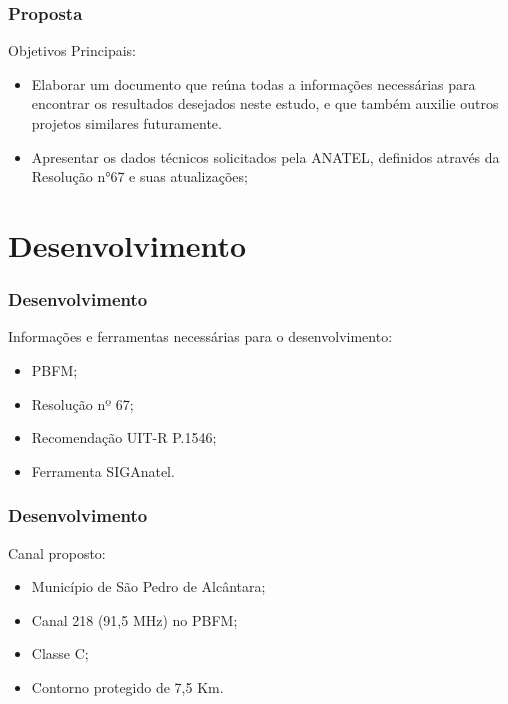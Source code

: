 \documentclass{beamer}
\begin{document}
    \begin{frame}
    
      \frametitle{Proposta}
      
      Objetivos Principais:
      
      \begin{itemize}
	  
	  \item Elaborar um documento que reúna todas a informações necessárias
	  para encontrar os resultados desejados neste estudo, e que também 
	  auxilie outros projetos similares futuramente.
	    
	  \item Apresentar os dados técnicos solicitados pela 
	    ANATEL, definidos através da Resolução n°67 e suas atualizações;
	    
	    
      \end{itemize}
    
    
    \end{frame}

    \section{Desenvolvimento}
      
    \begin{frame}
    
      \frametitle{Desenvolvimento}
      
          Informações e ferramentas necessárias para o desenvolvimento:
	\begin{itemize}
 
    
	  \item PBFM;
	  \item Resolução nº 67;
	  \item Recomendação UIT-R P.1546;
	  \item Ferramenta SIGAnatel.
      
      \end{itemize}
  
    \end{frame}
    
    \begin{frame}
    
      \frametitle{Desenvolvimento}
      
          Canal proposto:
	\begin{itemize}
	

	  \item Município de São Pedro de Alcântara;
	  \item Canal 218 (91,5 MHz) no PBFM;
	  \item Classe C;
	  \item Contorno protegido de 7,5 Km.
      
      \end{itemize}
  
    \end{frame}
    
\end{document}
